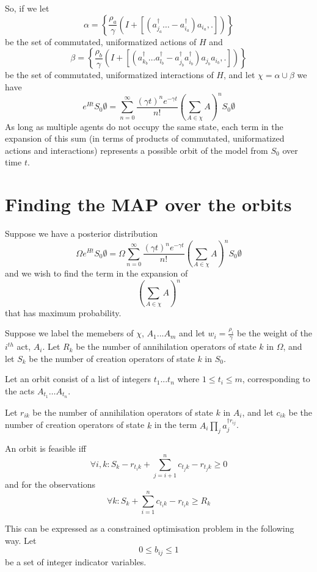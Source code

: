 \documentclass{article}
\begin{document}
So, if we let
\[
\alpha = \left\{ \frac{\rho_a}{\gamma}\left(I + [(a^\dag_{j_a}\ldots - a^\dag_{i_a})a_{i_a},.] \right) \right\}
\]
be the set of commutated, uniformatized actions of $H$ and
\[
\beta = \left\{ \frac{\rho_b}{\gamma}\left(I + [(a^\dag_{k_b}\dots a^\dag_{l_b} - a^\dag_{j_b}a^\dag_{i_b})a_{j_b}a_{i_b},.] \right) \right\}
\]
be the set of commutated, uniformatized interactions of $H$, and let $\chi = \alpha \cup \beta$ we have
\[
e^{Ht}S_0\emptyset = \sum_{n=0}^\infty  \frac{(\gamma t)^n e^{-\gamma t}}{n!}\left(\sum_{A\in \chi} A\right)^nS_0\emptyset
\]
As long as multiple agents do not occupy the same state, each term in the expansion of this sum (in terms of products of commutated, uniformatized actions and interactions) represents a possible orbit of the model from $S_0$ over time $t$.

\section{Finding the MAP over the orbits}

Suppose we have a posterior distribution
\[
\Omega e^{Ht}S_0\emptyset = \Omega \sum_{n=0}^\infty  \frac{(\gamma t)^n e^{-\gamma t}}{n!}\left(\sum_{A\in \chi} A\right)^nS_0\emptyset
\]
and we wish to find the term in the expansion of
\[
\left(\sum_{A\in \chi} A\right)^n
\]
that has maximum probability.

Suppose we label the memebers of $\chi$, $A_1...A_m$ and let $w_i = \frac{\rho_i}{\gamma}$ be the weight of the $i^{th}$ act, $A_i$. Let $R_k$ be the number of annihilation operators of state $k$ in $\Omega$, and let $S_k$ be the number of creation operators of state $k$ in $S_0$.

Let an orbit consist of a list of integers $t_1...t_n$ where $1 \le t_i \le m$, corresponding to the acts $A_{t_1}\dots A_{t_n}$.

Let $r_{ik}$ be the number of annihilation operators of state $k$ in $A_i$, and let $c_{ik}$ be the number of creation operators of state $k$ in the term $A_i\prod_j a^{\dag r_{ij}}_j$.

An orbit is feasible iff
\[
\forall i,k: S_k- r_{t_ik} + \sum_{j=i+1}^n c_{t_jk} -r_{t_jk}  \ge 0
\]
and for the observations
\[
\forall k: S_k + \sum_{i=1}^n c_{t_ik} - r_{t_ik} \ge R_k
\]

This can be expressed as a constrained optimisation problem in the following way. Let
\[
0 \le b_{ij} \le 1
\]
be a set of integer indicator variables.
\end{document}

